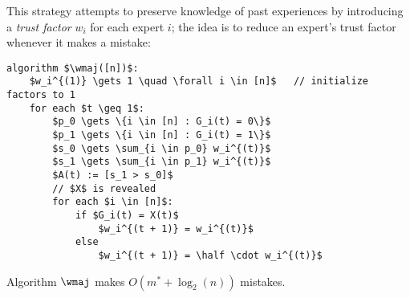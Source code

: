 This strategy attempts to preserve knowledge of past experiences by introducing a \emph{trust factor} $w_i$ for each expert $i$; the idea is to reduce an expert's trust factor whenever it makes a mistake:
\begin{lstlisting}[caption = {Weighted Majority}, label = {lst:exp-wm}]
algorithm $\wmaj([n])$:
    $w_i^{(1)} \gets 1 \quad \forall i \in [n]$   // initialize factors to 1
    for each $t \geq 1$:
        $p_0 \gets \{i \in [n] : G_i(t) = 0\}$
        $p_1 \gets \{i \in [n] : G_i(t) = 1\}$
        $s_0 \gets \sum_{i \in p_0} w_i^{(t)}$
        $s_1 \gets \sum_{i \in p_1} w_i^{(t)}$
        $A(t) := [s_1 > s_0]$
        // $X$ is revealed
        for each $i \in [n]$:
            if $G_i(t) = X(t)$
                $w_i^{(t + 1)} = w_i^{(t)}$
            else
                $w_i^{(t + 1)} = \half \cdot w_i^{(t)}$
\end{lstlisting}

\begin{theorem}\label{lem:exp-wm-errors}
    Algorithm $\wmaj$ makes $O (m^* + \log_2(n))$ mistakes.
\end{theorem}

